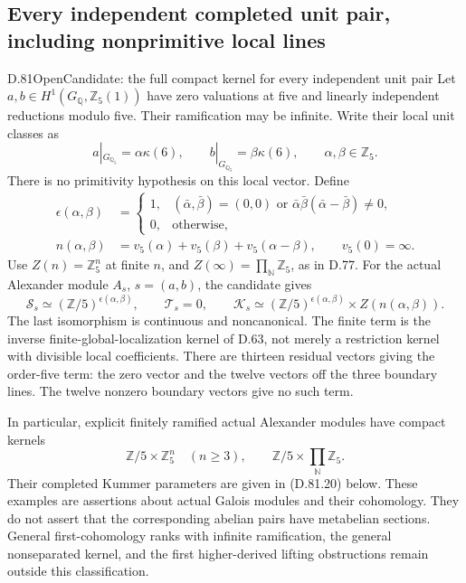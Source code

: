 \subsection{Every independent completed unit pair, including nonprimitive local lines}

\begin{statement}{D.81}{Open}{Candidate: the full compact kernel for every independent unit pair}
Let \(a,b\in H^1(G_{\mathbb Q},\mathbb Z_5(1))\) have zero
valuations at five and linearly independent reductions modulo five.
Their ramification may be infinite. Write their local unit classes as
\[
 a|_{G_{\mathbb Q_5}}=\alpha\kappa(6),\qquad
 b|_{G_{\mathbb Q_5}}=\beta\kappa(6),
 \qquad \alpha,\beta\in\mathbb Z_5.
                                                               \tag{D.81.1}
\]
There is no primitivity hypothesis on this local vector. Define
\[
 \begin{split}
 \epsilon(\alpha,\beta)&=
 \begin{cases}
  1,&(\bar\alpha,\bar\beta)=(0,0)
       \text{ or }\bar\alpha\bar\beta(\bar\alpha-\bar\beta)\ne0,\\
  0,&\text{otherwise},
 \end{cases}\\
 n(\alpha,\beta)&=
      v_5(\alpha)+v_5(\beta)+v_5(\alpha-\beta),
       \qquad v_5(0)=\infty.
 \end{split}                                                   \tag{D.81.2}
\]
Use \(Z(n)=\mathbb Z_5^n\) at finite \(n\), and
\(Z(\infty)=\prod_{\mathbb N}\mathbb Z_5\), as in D.77.
For the actual Alexander module \(A_s\), \(s=(a,b)\), the candidate gives
\[
 \mathcal S_s\simeq(\mathbb Z/5)^{\epsilon(\alpha,\beta)},
 \qquad \mathcal T_s=0,\qquad
 \mathcal K_s\simeq
       (\mathbb Z/5)^{\epsilon(\alpha,\beta)}
                         \times Z(n(\alpha,\beta)).
                                                               \tag{D.81.3}
\]
The last isomorphism is continuous and noncanonical. The finite term
is the inverse finite-global-localization kernel of D.63, not merely
a restriction kernel with divisible local coefficients.
There are thirteen residual vectors giving the order-five term:
the zero vector and the twelve vectors off the three boundary lines.
The twelve nonzero boundary vectors give no such term.

In particular, explicit finitely ramified actual Alexander modules
have compact kernels
\[
  \mathbb Z/5\times\mathbb Z_5^n\quad(n\ge3),
  \qquad
  \mathbb Z/5\times\prod_{\mathbb N}\mathbb Z_5.
                                                               \tag{D.81.4}
\]
Their completed Kummer parameters are given in (D.81.20) below.
These examples are assertions about actual Galois modules and their
cohomology. They do not assert that the corresponding abelian pairs
have metabelian sections. General first-cohomology ranks with
infinite ramification, the general nonseparated kernel, and the
first higher-derived lifting obstructions remain outside this
classification.
\end{statement}

